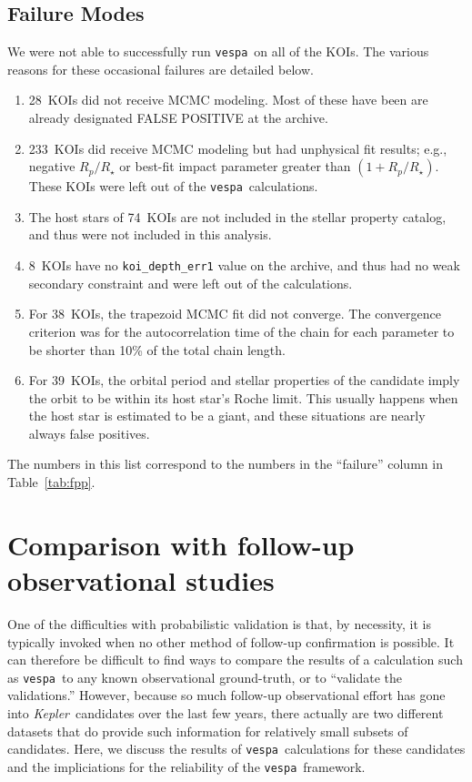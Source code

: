 \documentclass{emulateapj}
\newcommand{\Tab}[1]{Table~\ref{tab:#1}}
\newcommand{\tab}[1]{\Tab{#1}}
\newcommand{\sectlabel}[1]{\label{sect:#1}}
\newcommand{\nbadphot}{28} %
\newcommand{\nbadrowemcmc}{233}
\newcommand{\nbadstellar}{74} %
\newcommand{\nbadsec}{8} %
\newcommand{\nbadtrapfit}{38} %
\newcommand{\nbadroche}{39}
\newcommand{\kepler}{\textit{Kepler}}
\newcommand{\vespa}{\texttt{vespa}}
\begin{document}
\subsection{Failure Modes}
\sectlabel{failures}


We were not able to successfully run \vespa\ on all of the KOIs. The 
various reasons for these occasional failures are detailed below.  
\begin{enumerate}
\item \nbadphot\ KOIs did not receive MCMC modeling.  Most of these
  have been are already designated FALSE POSITIVE at the archive.
\item \nbadrowemcmc\ KOIs did receive MCMC modeling but had unphysical fit
  results; e.g., negative $R_p/R_\star$ or best-fit impact parameter
  greater than $(1 + R_p/R_\star)$.  These KOIs were left out of the 
  \vespa\ calculations.
\item The host stars of \nbadstellar\ KOIs are not included in the
   stellar property catalog, and thus were not
  included in this analysis.
\item \nbadsec\ KOIs have no \verb|koi_depth_err1| value on the archive,
  and thus had no weak secondary constraint and were left out of the
  calculations.
\item For \nbadtrapfit\ KOIs, the trapezoid MCMC fit did not converge.  The
  convergence criterion was for the autocorrelation time of the chain
  for each parameter to be shorter than 10\% of the total chain
  length.
\item For \nbadroche\ KOIs, the orbital period and stellar properties of the 
  candidate imply the orbit to be within its host star's Roche limit.  This
  usually happens when the host star is estimated to be a giant, and
  these situations are nearly always false positives. 
\end{enumerate}
The numbers in this list correspond to the numbers in
the ``failure'' column in \tab{fpp}.  

\section{Comparison with follow-up observational studies}
\sectlabel{comparisons} 

One of the difficulties with probabilistic
validation is that, by necessity, it is typically invoked when no
other method of follow-up confirmation is possible.  It can therefore
be difficult to find ways to compare the results of a calculation such
as \vespa\ to any known observational ground-truth, or to ``validate
the validations.''  However, because so much follow-up observational
effort has gone into \kepler\ candidates over the last few years,
there actually are two different datasets that do provide such
information for relatively small subsets of candidates.  Here, we
discuss the results of \vespa\ calculations for these candidates and
the impliciations for the reliability of the \vespa\ framework.
\end{document}
